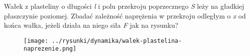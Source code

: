 Wałek z plasteliny o długości \emph{l} i polu przekroju poprzecznego \emph{S} leży na gładkiej płaszczynie poziomej. Zbadać zależność naprężenia w przekroju odległym o \emph{x} od końca wałka, jeżeli działa na niego siła \emph{F} jak na rysunku?

\begin{figure}[H]
	\centering
	\texttt{[image: ../rysunki/dynamika/walek-plastelina-naprezenie.png]}
\end{figure}

